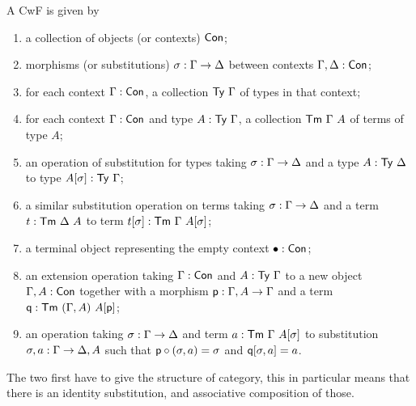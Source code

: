 A \acrshort{CwF} is given by%
%
\begin{enumerate}
  \item a collection of objects (or contexts) \(\mathsf{Con}\);
  \item morphisms (or substitutions) \(\sigma : \Gamma \to \Delta\) between contexts
  \(\Gamma, \Delta : \mathsf{Con}\);
  \item for each context \(\Gamma : \mathsf{Con}\), a collection \(\mathsf{Ty}\ \Gamma\) of types in
  that context;
  \item for each context \(\Gamma : \mathsf{Con}\) and type \(A : \mathsf{Ty}\ \Gamma\), a collection
  \(\mathsf{Tm}\ \Gamma\ A\) of terms of type \(A\);
  \item an operation of substitution for types taking \(\sigma : \Gamma \to \Delta\)
  and a type \(A : \mathsf{Ty}\ \Delta\) to type \(A[\sigma] : \mathsf{Ty}\ \Gamma\);
  \item \label{item:term-subst} a similar substitution operation on terms taking
  \(\sigma : \Gamma \to \Delta\) and a term \(t : \mathsf{Tm}\ \Delta\ A\) to term
  \(t[\sigma] : \mathsf{Tm}\ \Gamma\ A[\sigma]\);
  \item a terminal object representing the empty context \(\bullet : \mathsf{Con}\);
  \item an extension operation taking \(\Gamma : \mathsf{Con}\) and \(A : \mathsf{Ty}\ \Gamma\)
  to a new object \(\Gamma, A : \mathsf{Con}\) together with a morphism
  \(\mathsf{p} : \Gamma, A \to \Gamma\) and a term \(\pq : \CTm\ (\Ga, A)\ A[\pp]\);
  \item an operation taking \(\sigma : \Gamma \to \Delta\) and term
  \(a : \CTm\ \Ga\ A[\sigma]\) to substitution \(\sigma, a : \Gamma \to \Delta, A\)
  such that \(\mathsf{p} \circ (\sigma, a) = \sigma\) and \(\mathsf{q}[\sigma, a] = a\).
\end{enumerate}
The two first have to give the structure of category, this in particular means
that there is an identity substitution, and associative composition of those.

